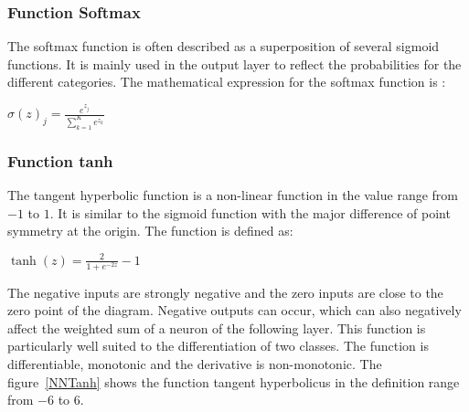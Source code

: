 \subsubsection{Function Softmax}

The softmax function is often described as a superposition of several sigmoid functions. It is mainly used in the output layer to reflect the probabilities for the different categories. The mathematical expression for the softmax function is \cite{Gupta:2020b}:

\begin{center}
$\sigma(z)_j = \frac{e^{z_j}}{\sum\nolimits_{k=1}^K e^{z_k}}$
\end{center}


\subsubsection{Function tanh}

The tangent hyperbolic function is a non-linear function in the value range from $-1$ to $1$. It is similar to the sigmoid function with the major difference of point symmetry at the origin. The function is defined as:

\begin{center}
  $\tanh(z) = \frac{2}{1 + e^{-2z}} -1$
\end{center}

The negative inputs are strongly negative and the zero inputs are close to the zero point of the diagram. Negative outputs can occur, which can also negatively affect the weighted sum of a neuron of the following layer. This function is particularly well suited to the differentiation of two classes. The function is differentiable, monotonic and the derivative is non-monotonic. \cite{Gupta:2020b} The figure~\ref{NNTanh} shows the function tangent hyperbolicus in the definition range from $-6$ to $6$.

